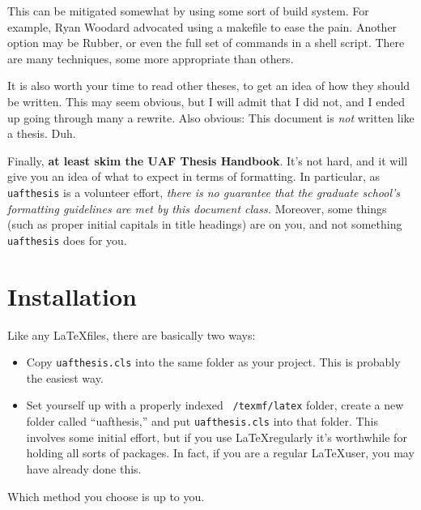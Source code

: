 This can be mitigated somewhat by using some sort of build system. For example,
Ryan Woodard advocated using a makefile to ease the pain. Another option may
be Rubber, or even the full set of commands in a shell script. There are many
techniques, some more appropriate than others. \cite{buildsystems}

It is also worth your time to read other theses, to get an idea of how they
should be written. This may seem obvious, but I will admit that I did not, and
I ended up going through many a rewrite. Also obvious: This document is
\emph{not} written like a thesis. Duh.

Finally, \textbf{at least skim the UAF Thesis Handbook}. \cite{handbook} It's
not hard, and it will give you an idea of what to expect in terms of formatting.
In particular, as \texttt{uafthesis} is a volunteer effort, \emph{there is no
guarantee that the graduate school's formatting guidelines are met by this
document class.} Moreover, some things (such as proper initial capitals in title
headings) are on you, and not something \texttt{uafthesis} does for you.


\section{Installation}

Like any \LaTeX files, there are basically two ways:

\begin{itemize}
\item Copy \texttt{uafthesis.cls} into the same folder as your project. This is
probably the easiest way.
\item Set yourself up with a properly indexed \texttt{~/texmf/latex} folder,
create a new folder called ``uafthesis,'' and put \texttt{uafthesis.cls} into
that folder. This involves some initial effort, but if you use \LaTeX regularly
it's worthwhile for holding all sorts of packages. In fact, if you are a
regular \LaTeX user, you may have already done this.
\end{itemize}

Which method you choose is up to you.
